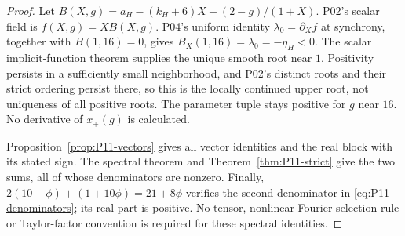 \documentclass[11pt]{article}
\theoremstyle{definition}
\theoremstyle{remark}
\begin{document}
\begin{proof}
Let $B(X,g)=a_H-(k_H+6)X+(2-g)/(1+X)$.
P02's scalar field is $f(X,g)=XB(X,g)$. P04's uniform identity
$\lambda_0=\partial_X f$ at synchrony, together with $B(1,16)=0$,
gives $B_X(1,16)=\lambda_0=-\eta_H<0$.
The scalar implicit-function theorem supplies the unique smooth root
near $1$. Positivity persists in a sufficiently small neighborhood,
and P02's distinct roots and their strict ordering persist there, so
this is the locally continued upper root, not uniqueness of all positive
roots. The parameter tuple stays positive for $g$ near $16$.
No derivative of $x_+(g)$ is calculated.

Proposition~\ref{prop:P11-vectors} gives all vector identities and
the real block with its stated sign. The spectral theorem and
Theorem~\ref{thm:P11-strict} give the two sums, all of whose denominators
are nonzero. Finally,
$2(10-\phi)+(1+10\phi)=21+8\phi$ verifies the second denominator
in \eqref{eq:P11-denominators}; its real part is positive.
No tensor, nonlinear Fourier selection rule or Taylor-factor convention
is required for these spectral identities.
\end{proof}
\end{document}
